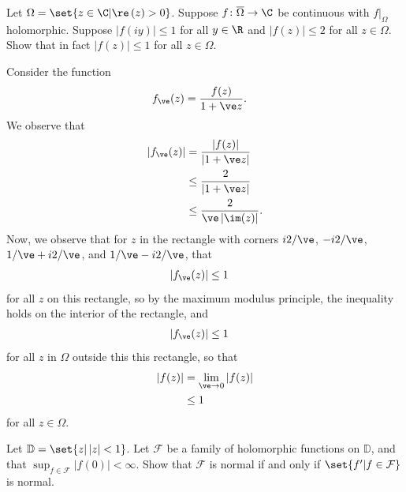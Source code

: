 \documentclass[10pt]{mypackage}
\renewcommand{\D}{\mathbb{D}}
\begin{document}
\begin{problem}[Problem 4]
  Let $\Omega = \set{z\in \C | \re\left( z \right) > 0}$. Suppose $ f\colon \overline{\Omega}\rightarrow \C $ be continuous with $f|_{\Omega}$ holomorphic. Suppose $\left\vert f\left( iy \right) \right\vert\leq 1$ for all $y\in \R$ and $\left\vert f\left( z \right) \right\vert\leq 2$ for all $z\in \Omega$. Show that in fact $\left\vert f(z) \right\vert\leq 1$ for all $z\in \Omega$.
\end{problem}
\begin{solution}
  Consider the function
  \begin{align*}
    f_{\ve}(z) &= \frac{f(z)}{1 + \ve z}.
  \end{align*}
  We observe that
  \begin{align*}
    \left\vert f_{\ve}(z) \right\vert &= \frac{\left\vert f(z) \right\vert}{\left\vert 1 + \ve z \right\vert}\\
                                      &\leq \frac{2}{\left\vert 1 + \ve z \right\vert}\\
                                      &\leq \frac{2}{\ve \left\vert \im(z) \right\vert}.
  \end{align*}
  Now, we observe that for $z$ in the rectangle with corners $i2/\ve$, $-i2/\ve$, $1/\ve + i2/\ve$, and $1/\ve - i2/\ve$, that
  \begin{align*}
    \left\vert f_{\ve}(z) \right\vert &\leq 1
  \end{align*}
  for all $z$ on this rectangle, so by the maximum modulus principle, the inequality holds on the interior of the rectangle, and
  \begin{align*}
    \left\vert f_{\ve}(z) \right\vert &\leq 1
  \end{align*}
  for all $z$ in $\Omega$ outside this this rectangle, so that
  \begin{align*}
    \left\vert f(z) \right\vert &= \lim_{\ve\rightarrow 0} \left\vert f(z) \right\vert\\
                                &\leq 1
  \end{align*}
  for all $z\in \Omega$.
\end{solution}
\begin{problem}[Problem 5]
  Let $\D = \set{z | \left\vert z \right\vert < 1}$. Let $\mathcal{F}$ be a family of holomorphic functions on $\D$, and that $\sup_{f\in \mathcal{F}}\left\vert f(0) \right\vert < \infty$. Show that $\mathcal{F}$ is normal if and only if $\set{f' | f\in \mathcal{F}}$ is normal.
\end{problem}
\end{document}
